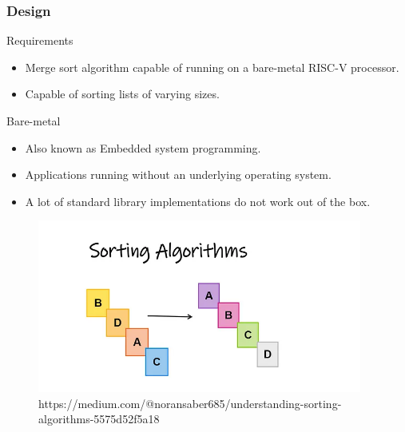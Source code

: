 \begin{frame}[hoved]
	\frametitle{Design}
	\begin{minipage}[t]{0.45\textwidth}
		{\large Requirements}
		\begin{itemize}
			\item Merge sort algorithm capable of running on a bare-metal RISC-V
			      processor.
			\item Capable of sorting lists of varying sizes.
		\end{itemize}
		{\large Bare-metal}
		\begin{itemize}
			\item Also known as Embedded system programming.
			\item Applications running without an underlying operating system.
			\item A lot of standard library implementations do not work out of the
			      box.
		\end{itemize}
	\end{minipage}
	\hfill
	\begin{minipage}[t]{0.45\textwidth}
		\begin{figure}
			\begin{center}
				\includegraphics[width=0.95\textwidth]{figures/sorting.png}
			\end{center}
			\caption{\tiny https://medium.com/@noransaber685/understanding-sorting-algorithms-5575d52f5a18}\label{fig:}
		\end{figure}
	\end{minipage}
\end{frame}


